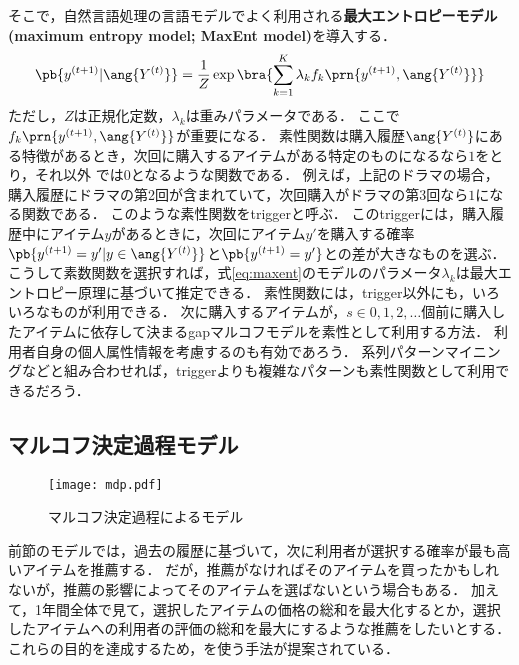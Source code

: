 そこで，自然言語処理の言語モデルでよく利用される\textbf{最大エントロピーモデル (maximum entropy model; MaxEnt model)}を導入する．
\begin{equation}
\pb{y^{(t+1)}|\ang{Y^{(t)}}}=
\frac{1}{Z}
\exp\bra{\sum_{k=1}^K\lambda_k f_k\prn{y^{(t+1)},\ang{Y^{(t)}}}}
\label{eq:maxent}
\end{equation}
ただし，$Z$は正規化定数，$\lambda_k$は重みパラメータである．
ここで $f_k\prn{y^{(t+1)},\ang{Y^{(t)}}}$が重要になる．
素性関数は購入履歴$\ang{Y^{(t)}}$にある特徴があるとき，次回に購入するアイテムがある特定のものになるなら$1$をとり，それ以外
では$0$となるような関数である．
例えば，上記のドラマの場合，購入履歴にドラマの第2回が含まれていて，次回購入がドラマの第3回なら$1$になる関数である．
このような素性関数をtriggerと呼ぶ．
このtriggerには，購入履歴中にアイテム$y$があるときに，次回にアイテム$y'$を購入する確率
$\pb{y^{(t+1)}=y'|y\in \ang{Y^{(t)}}}$と$\pb{y^{(t+1)}=y'}$との差が大きなものを選ぶ．
こうして素数関数を選択すれば，式\eqref{eq:maxent}のモデルのパラメータ$\lambda_k$は最大エントロピー原理\cite{jb:031:00}に基づいて推定できる．
素性関数には，trigger以外にも，いろいろなものが利用できる．
次に購入するアイテムが，$s\in{0,1,2,\dotsc}$個前に購入したアイテムに依存して決まるgapマルコフモデルを素性として利用する方法\cite{trieice:07:01}．
利用者自身の個人属性情報を考慮するのも有効であろう．
系列パターンマイニング\cite{eb:044:00,icde:01:02}などと組み合わせれば，triggerよりも複雑なパターンも素性関数として利用できるだろう．

\subsection{マルコフ決定過程モデル}

\begin{figure}
\centering
\texttt{[image: mdp.pdf]}
\caption{マルコフ決定過程によるモデル}
\label{fig:mdpmodel}
\end{figure}

前節のモデルでは，過去の履歴に基づいて，次に利用者が選択する確率が最も高いアイテムを推薦する．
だが，推薦がなければそのアイテムを買ったかもしれないが，推薦の影響によってそのアイテムを選ばないという場合もある．
加えて，1年間全体で見て，選択したアイテムの価格の総和を最大化するとか，選択したアイテムへの利用者の評価の総和を最大にするような推薦をしたいとする．
これらの目的を達成するため，を使う手法が提案されている\cite{uai:02:02,jmlr:05:03}．

